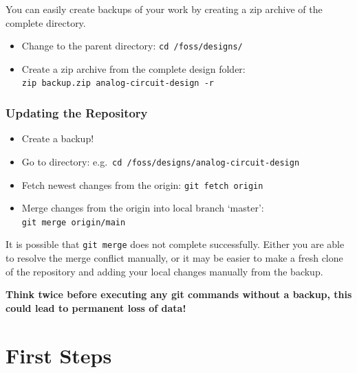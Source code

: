 \documentclass[
  a4paper,
  DIV=11,
  numbers=noendperiod]{scrartcl}
\providecommand{\tightlist}{%
  \setlength{\itemsep}{0pt}\setlength{\parskip}{0pt}}\usepackage{longtable,booktabs,array}
\begin{document}
You can easily create backups of your work by creating a zip archive of
the complete directory.

\begin{itemize}
\tightlist
\item
  Change to the parent directory: \texttt{cd\ /foss/designs/}
\item
  Create a zip archive from the complete design folder:
  \texttt{zip\ backup.zip\ analog-circuit-design\ -r}
\end{itemize}

\subsubsection{Updating the Repository}\label{updating-the-repository}

\begin{itemize}
\tightlist
\item
  Create a backup!
\item
  Go to directory: e.g.~\texttt{cd\ /foss/designs/analog-circuit-design}
\item
  Fetch newest changes from the origin: \texttt{git\ fetch\ origin}
\item
  Merge changes from the origin into local branch `master':
  \texttt{git\ merge\ origin/main}
\end{itemize}

\begin{tcolorbox}[enhanced jigsaw, titlerule=0mm, left=2mm, coltitle=black, toprule=.15mm, breakable, opacitybacktitle=0.6, colframe=quarto-callout-warning-color-frame, bottomtitle=1mm, toptitle=1mm, opacityback=0, colbacktitle=quarto-callout-warning-color!10!white, title=\textcolor{quarto-callout-warning-color}{\faExclamationTriangle}\hspace{0.5em}{Git Merge Conflicts}, arc=.35mm, rightrule=.15mm, colback=white, bottomrule=.15mm, leftrule=.75mm]

It is possible that \texttt{git\ merge} does not complete successfully.
Either you are able to resolve the merge conflict manually, or it may be
easier to make a fresh clone of the repository and adding your local
changes manually from the backup.

\textbf{Think twice before executing any git commands without a backup,
this could lead to permanent loss of data!}

\end{tcolorbox}

\section{First Steps}\label{sec-first-steps}
\end{document}
